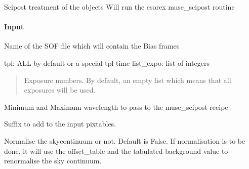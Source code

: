 \documentclass[letterpaper,10pt,english]{sphinxmanual}
\begin{document}
\begin{fulllineitems}
\begin{fulllineitems}
\label{\detokenize{api/pymusepipe:pymusepipe.prep_recipes_pipe.PipePrep.run_scipost}}
\pysigstartsignatures
{}
\pysigstopsignatures
\sphinxAtStartPar
Scipost treatment of the objects
Will run the esorex muse\_scipost routine


\paragraph{Input}
\label{\detokenize{api/pymusepipe:id107}}\begin{description}
\sphinxAtStartPar
Name of the SOF file which will contain the Bias frames

\end{description}

\sphinxAtStartPar
tpl: ALL by default or a special tpl time
list\_expo: list of integers
\begin{quote}

\sphinxAtStartPar
Exposure numbers. By default, an empty list which means that all
exposures will be used.
\end{quote}
\begin{description}
\sphinxAtStartPar
Minimum and Maximum wavelength to pass to the muse\_scipost recipe

\sphinxAtStartPar
Suffix to add to the input pixtables.

\sphinxAtStartPar
Normalise the skycontinuum or not. Default is False.
If normalisation is to be done, it will use the offset\_table
and the tabulated background value to renormalise the sky
continuum.


\end{description}
\end{fulllineitems}
\end{fulllineitems}
\end{document}
